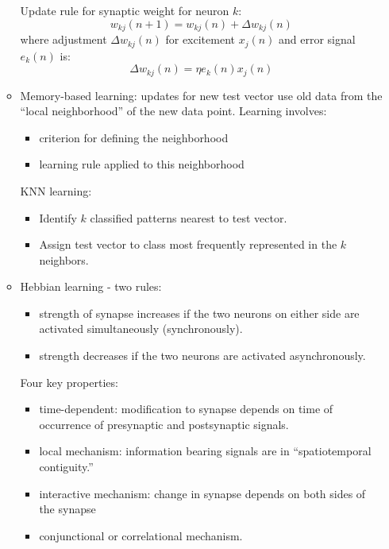 \documentclass[paper=a4, fontsize=11pt]{scrartcl} %
\begin{document}
\begin{itemize}
\begin{itemize}
            Update rule for synaptic weight for neuron $k$:
                \[ w_{kj}(n+1) = w_{kj}(n) + \Delta w_{kj}(n) \]
                where adjustment $\Delta w_{kj}(n)$ for excitement $x_j(n)$ and error signal $e_k(n)$ is:
                \[ \Delta w_{kj}(n) = \eta e_k(n)x_j(n) \]

            \item Memory-based learning: updates for new test vector use old data from the ``local neighborhood'' of the new data point. Learning involves:
            \begin{itemize}
                \item criterion for defining the neighborhood
                \item learning rule applied to this neighborhood
            \end{itemize}
            KNN learning:
            \begin{itemize}
                \item Identify $k$ classified patterns nearest to test vector.
                \item Assign test vector to class most frequently represented in the $k$ neighbors.
            \end{itemize}

            \item Hebbian learning - two rules:
            \begin{itemize}
                \item strength of synapse increases if the two neurons on either side are activated simultaneously (synchronously).
                \item strength decreases if the two neurons are activated asynchronously.
            \end{itemize}
            Four key properties:
            \begin{itemize}
                \item time-dependent: modification to synapse depends on time of occurrence of presynaptic and postsynaptic signals.
                \item local mechanism: information bearing signals are in ``spatiotemporal contiguity.''
                \item interactive mechanism: change in synapse depends on both sides of the synapse
                \item conjunctional or correlational mechanism.
            \end{itemize}


\end{itemize}
\end{itemize}
\end{document}
